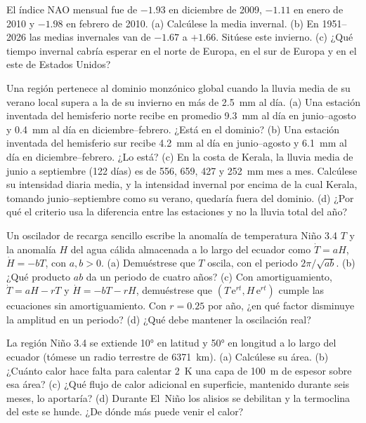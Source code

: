 \begin{exercise}[$\star\star$]\label{exo:b2:climate-variability:8}
El índice NAO mensual fue de $-1.93$ en diciembre de 2009, $-1.11$ en enero de 2010 y $-1.98$ en
febrero de 2010. (a) Calcúlese la media invernal. (b) En 1951--2026 las medias invernales van de
$-1.67$ a $+1.66$. Sitúese este invierno. (c) ¿Qué tiempo invernal cabría esperar en el norte de
Europa, en el sur de Europa y en el este de Estados Unidos?
\end{exercise}

\begin{exercise}[$\star\star$]\label{exo:b2:climate-variability:9}
Una región pertenece al dominio monzónico global cuando la lluvia media de su verano local supera a la
de su invierno en más de \qty{2.5}{mm} al día. (a) Una estación inventada del hemisferio
norte recibe en promedio \qty{9.3}{mm} al día en junio--agosto y \qty{0.4}{mm} al día en
diciembre--febrero. ¿Está en el dominio? (b) Una estación inventada del hemisferio sur
recibe \qty{4.2}{mm} al día en junio--agosto y \qty{6.1}{mm} al día en diciembre--febrero. ¿Lo
está? (c) En la costa de Kerala, la lluvia media de junio a septiembre (122 días) es de 556, 659, 427 y
\qty{252}{mm} mes a mes. Calcúlese su intensidad diaria media, y la intensidad invernal por encima de la cual Kerala,
tomando junio--septiembre como su verano, quedaría fuera del dominio. (d) ¿Por qué el criterio
usa la diferencia entre las estaciones y no la lluvia total del año?
\end{exercise}

\begin{exercise}[$\star\star\star$]\label{exo:b2:climate-variability:10}
Un oscilador de recarga sencillo escribe la anomalía de temperatura Niño 3.4 $T$ y la anomalía $H$ del
agua cálida almacenada a lo largo del ecuador como $\dot T = aH$, $\dot H = -bT$, con $a, b > 0$. (a) Demuéstrese
que $T$ oscila, con el periodo $2\pi/\sqrt{ab}$. (b) ¿Qué producto $ab$ da un periodo de
cuatro años? (c) Con amortiguamiento, $\dot T = aH - rT$ y $\dot H = -bT - rH$, demuéstrese que
$(T\,\mathrm{e}^{rt}, H\,\mathrm{e}^{rt})$ cumple las ecuaciones sin amortiguamiento. Con $r = 0.25$ por
año, ¿en qué factor disminuye la amplitud en un periodo? (d) ¿Qué debe mantener la oscilación
real?
\end{exercise}

\begin{exercise}[$\star\star\star$]\label{exo:b2:climate-variability:11}
La región Niño 3.4 se extiende \ang{10} en latitud y \ang{50} en longitud a lo largo del ecuador
(tómese un radio terrestre de \qty{6371}{km}). (a) Calcúlese su área. (b) ¿Cuánto calor hace falta para
calentar \qty{2}{K} una capa de \qty{100}{m} de espesor sobre esa área? (c) ¿Qué flujo de calor adicional en superficie,
mantenido durante seis meses, lo aportaría? (d) Durante El~Niño los alisios se debilitan y la
termoclina del este se hunde. ¿De dónde más puede venir el calor?
\end{exercise}

